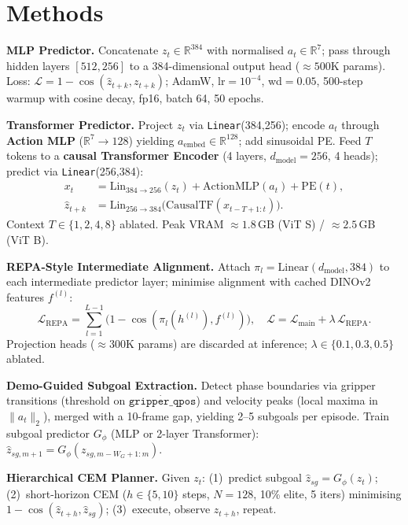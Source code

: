 \documentclass[10pt,twocolumn,letterpaper]{article}
\begin{document}
\section{Methods}

\noindent\textbf{MLP Predictor.}
Concatenate $z_t\!\in\!\mathbb{R}^{384}$ with normalised $a_t\!\in\!\mathbb{R}^{7}$; pass through hidden layers $[512,256]$ to a 384-dimensional output head (${\approx}500$K params).
Loss: $\mathcal{L}=1-\cos(\hat{z}_{t+k},z_{t+k})$; AdamW, lr$=10^{-4}$, wd$=0.05$, 500-step warmup with cosine decay, fp16, batch 64, 50 epochs.

\noindent\textbf{Transformer Predictor.}
Project $z_t$ via \texttt{Linear}(384,256); encode $a_t$ through \textbf{Action MLP} ($\mathbb{R}^7\!\to\!128$) yielding $a_\text{embed}\!\in\!\mathbb{R}^{128}$; add sinusoidal PE. Feed $T$ tokens to a \textbf{causal Transformer Encoder} (4 layers, $d_\text{model}=256$, 4 heads); predict via \texttt{Linear}(256,384):
\begin{align}
x_t &= \mathrm{Lin}_{384\to256}(z_t)+\mathrm{ActionMLP}(a_t)+\mathrm{PE}(t),\\
\hat{z}_{t+k} &= \mathrm{Lin}_{256\to384}\!\bigl(\mathrm{CausalTF}(x_{t-T+1:t})\bigr).
\end{align}
Context $T\!\in\!\{1,2,4,8\}$ ablated. Peak VRAM ${\approx}1.8$\,GB (ViT S) / ${\approx}2.5$\,GB (ViT B).

\noindent\textbf{REPA-Style Intermediate Alignment.}
Attach $\pi_l\!=\!\mathrm{Linear}(d_\text{model},384)$ to each intermediate predictor layer; minimise alignment with cached DINOv2 features $f^{(l)}$:
\begin{equation}
\mathcal{L}_\text{REPA} = \sum_{l=1}^{L-1}\!\bigl(1-\cos(\pi_l(h^{(l)}),f^{(l)})\bigr), \quad \mathcal{L} = \mathcal{L}_\text{main}+\lambda\,\mathcal{L}_\text{REPA}.
\end{equation}
Projection heads (${\approx}300$K params) are discarded at inference; $\lambda\!\in\!\{0.1,0.3,0.5\}$ ablated.

\noindent\textbf{Demo-Guided Subgoal Extraction.}
Detect phase boundaries via gripper transitions (threshold on $\dot{\texttt{gripper\_qpos}}$) and velocity peaks (local maxima in $\|a_t\|_2$), merged with a 10-frame gap, yielding 2--5 subgoals per episode. Train subgoal predictor $G_\phi$ (MLP or 2-layer Transformer): $\hat{z}_{sg,m+1} = G_\phi(z_{sg,m-W_G+1:m})$.

\noindent\textbf{Hierarchical CEM Planner.}
Given $z_t$: (1)~predict subgoal $\hat{z}_{sg}\!=\!G_\phi(z_t)$; (2)~short-horizon CEM ($h\!\in\!\{5,10\}$ steps, $N{=}128$, 10\% elite, 5 iters) minimising $1-\cos(\hat{z}_{t+h},\hat{z}_{sg})$; (3)~execute, observe $z_{t+h}$, repeat.
\end{document}
